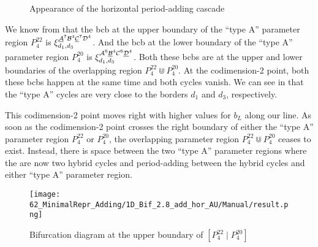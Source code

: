 \begin{figure}
	\centering
	\caption{Appearance of the horizontal period-adding cascade}
\end{figure}

We know from  that the \gls{bcb} at the upper boundary of the ``type A'' parameter region $P^{22}_4$ is $\xi_{d_1, d_3}^{\underline{\mathcal{A}}^7\mathcal{B}^4\underline{\mathcal{C}}^7\mathcal{D}^4}$.
And the \gls{bcb} at the lower boundary of the ``type A'' parameter region $P^{20}_4$ is $\xi_{d_1, d_3}^{\mathcal{A}^6\underline{\mathcal{B}}^4\mathcal{C}^6\underline{\mathcal{D}}^4}$.
Both these \glspl{bcb} are at the upper and lower boundaries of the overlapping region $P^{22}_4 \Cup P^{20}_4$.
At the codimension-2 point, both these \glspl{bcb} happen at the same time and both cycles vanish.
We can see in  that the ``type A'' cycles are very close to the borders $d_1$ and $d_3$, respectively.

This codimension-2 point moves right with higher values for $b_L$ along our line.
As soon as the codimension-2 point crosses the right boundary of either the ``type A'' parameter region $P^{22}_4$ or $P^{20}_4$, the overlapping parameter region $P^{22}_4 \Cup P^{20}_4$ ceases to exist.
Instead, there is space between the two ``type A'' parameter regions where the are now two hybrid cycles and period-adding between the hybrid cycles and either ``type A'' parameter region.

\begin{figure}
	\centering
	\texttt{[image: 62\_MinimalRepr\_Adding/1D\_Bif\_2.8\_add\_hor\_AU/Manual/result.png]}
	\caption{Bifurcation diagram at the upper boundary of $\left[P^{22}_4 \mid P^{20}_4\right]$}
	\label{fig:add.change.appa.hor.bif}
\end{figure}

